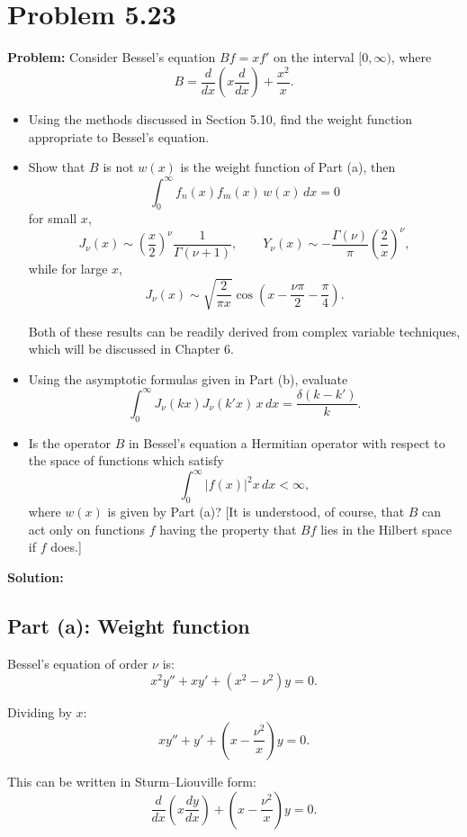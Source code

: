 \documentclass[12pt]{article}
\begin{document}
\section*{Problem 5.23}

\textbf{Problem:} Consider Bessel's equation $Bf = xf'$ on the interval $[0, \infty)$, where
\[
B = \frac{d}{dx}\left(x\frac{d}{dx}\right) + \frac{x^2}{x}.
\]
\begin{itemize}
\item[(a)] Using the methods discussed in Section 5.10, find the weight function appropriate to Bessel's equation.
\item[(b)] Show that $B$ is not $w(x)$ is the weight function of Part (a), then
\[
\int_0^{\infty}f_n(x)f_m(x)\,w(x)\,dx = 0
\]
for small $x$,
\[
J_\nu(x) \sim \left(\frac{x}{2}\right)^\nu \frac{1}{\Gamma(\nu+1)}, \qquad Y_\nu(x) \sim -\frac{\Gamma(\nu)}{\pi}\left(\frac{2}{x}\right)^\nu,
\]
while for large $x$,
\[
J_\nu(x) \sim \sqrt{\frac{2}{\pi x}}\cos\left(x - \frac{\nu\pi}{2} - \frac{\pi}{4}\right).
\]

Both of these results can be readily derived from complex variable techniques, which will be discussed in Chapter 6.

\item[(c)] Using the asymptotic formulas given in Part (b), evaluate
\[
\int_0^{\infty}J_\nu(kx)J_\nu(k'x)\,x\,dx = \frac{\delta(k-k')}{k}.
\]

\item[(d)] Is the operator $B$ in Bessel's equation a Hermitian operator with respect to the space of functions which satisfy
\[
\int_0^{\infty}|f(x)|^2 x\,dx < \infty,
\]
where $w(x)$ is given by Part (a)? [It is understood, of course, that $B$ can act only on functions $f$ having the property that $Bf$ lies in the Hilbert space if $f$ does.]
\end{itemize}

\bigskip
\textbf{Solution:}

\subsection*{Part (a): Weight function}

Bessel's equation of order $\nu$ is:
\[
x^2 y'' + xy' + (x^2 - \nu^2)y = 0.
\]

Dividing by $x$:
\[
xy'' + y' + \left(x - \frac{\nu^2}{x}\right)y = 0.
\]

This can be written in Sturm--Liouville form:
\[
\frac{d}{dx}\left(x\frac{dy}{dx}\right) + \left(x - \frac{\nu^2}{x}\right)y = 0.
\]
\end{document}
